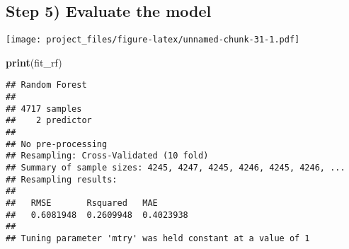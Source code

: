 \documentclass[
]{article}
\newenvironment{Shaded}{\begin{snugshade}}{\end{snugshade}}
\newcommand{\CommentTok}[1]{\textcolor[rgb]{0.56,0.35,0.01}{\textit{#1}}}
\newcommand{\DataTypeTok}[1]{\textcolor[rgb]{0.13,0.29,0.53}{#1}}
\newcommand{\DecValTok}[1]{\textcolor[rgb]{0.00,0.00,0.81}{#1}}
\newcommand{\KeywordTok}[1]{\textcolor[rgb]{0.13,0.29,0.53}{\textbf{#1}}}
\newcommand{\NormalTok}[1]{#1}
\newcommand{\OperatorTok}[1]{\textcolor[rgb]{0.81,0.36,0.00}{\textbf{#1}}}
\newcommand{\OtherTok}[1]{\textcolor[rgb]{0.56,0.35,0.01}{#1}}
\newcommand{\StringTok}[1]{\textcolor[rgb]{0.31,0.60,0.02}{#1}}
\begin{document}
\hypertarget{step-5-evaluate-the-model}{%
\subsection{Step 5) Evaluate the
model}\label{step-5-evaluate-the-model}}

\begin{Shaded}
\end{Shaded}

\texttt{[image: project\_files/figure-latex/unnamed-chunk-31-1.pdf]}

\begin{Shaded}
\begin{Highlighting}[]
\KeywordTok{print}\NormalTok{(fit_rf)}
\end{Highlighting}
\end{Shaded}

\begin{verbatim}
## Random Forest 
## 
## 4717 samples
##    2 predictor
## 
## No pre-processing
## Resampling: Cross-Validated (10 fold) 
## Summary of sample sizes: 4245, 4247, 4245, 4246, 4245, 4246, ... 
## Resampling results:
## 
##   RMSE       Rsquared   MAE      
##   0.6081948  0.2609948  0.4023938
## 
## Tuning parameter 'mtry' was held constant at a value of 1
\end{verbatim}

\begin{Shaded}
\end{Shaded}
\end{document}
